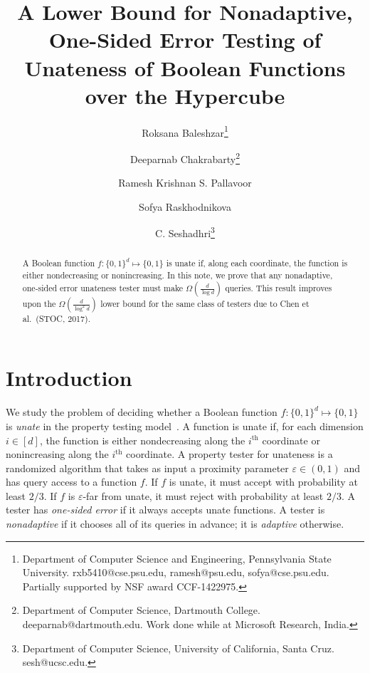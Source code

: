 \documentclass[11pt]{article}
\title{A Lower Bound for Nonadaptive, One-Sided Error Testing of Unateness of Boolean Functions over the Hypercube}
\author{Roksana Baleshzar\footnote{Department of Computer Science and Engineering, Pennsylvania State University. {\sf rxb5410@cse.psu.edu, ramesh@psu.edu, sofya@cse.psu.edu}. Partially supported by NSF award CCF-1422975. }
\and 
Deeparnab Chakrabarty\footnote{Department of Computer Science, Dartmouth College. {\sf deeparnab@dartmouth.edu}. Work done while at Microsoft Research, India.} 
\and 
Ramesh Krishnan S. Pallavoor\footnotemark[1] 
\and 
Sofya Raskhodnikova\footnotemark[1] 
\and 
C. Seshadhri\footnote{Department of Computer Science, University of California, Santa Cruz. {\sf sesh@ucsc.edu.}}
}
\date{}
\newcommand{\eps}{\varepsilon}
\def\bb{\mathbf{b}}
\newcommand{\ord}[2][th]{\ensuremath{{#2}^{\mathrm{#1}}}}
\newcommand{\cP}{\mathcal{P}}
\begin{document}
\maketitle

\begin{abstract}
A Boolean function $f:\{0,1\}^d \mapsto \{0,1\}$ is unate if, along each coordinate, the function is either nondecreasing or nonincreasing. In this note, we prove that any nonadaptive, one-sided error unateness tester must make $\Omega(\frac{d}{\log d})$ queries. This result improves upon the $\Omega(\frac{d}{\log^2 d})$ lower bound for the same class of testers due to Chen et al.~(STOC, 2017).
\end{abstract}

\section{Introduction}
We study the problem of deciding whether a Boolean function $f:\{0,1\}^d \mapsto \{0,1\}$ is \emph{unate} in the property testing
 model~\cite{RS96,GGR98}. A function is unate if, for each dimension $i \in [d]$, the function is either nondecreasing along the $\ord{i}$ coordinate or nonincreasing along the $\ord{i}$ coordinate.
% 
% 
A property tester for unateness is a randomized algorithm that takes as input
a proximity parameter $\eps \in (0,1)$ and has query access to a function $f$.
If $f$ is unate, it must accept with probability at least $2/3$. If $f$ is $\eps$-far from
unate, it must reject with probability at least $2/3$.
A tester has \emph{one-sided error} if it always accepts unate functions. 
A tester is \emph{nonadaptive} if it chooses all of its queries in advance; it is \emph{adaptive} otherwise.

% 
% 
\end{document}
